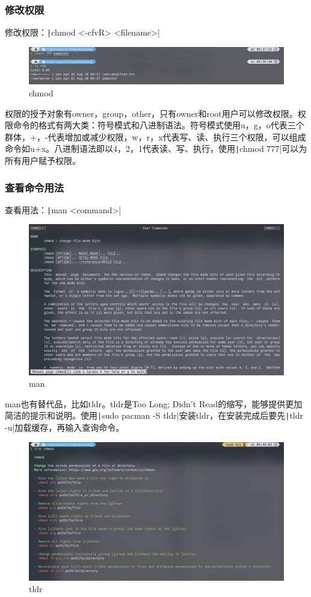 \documentclass[fontset=ubuntu]{ctexart}
\begin{document}
\begin{sloppypar}
\subsubsection{修改权限}
修改权限：\texttt|chmod <-cfvR> <filename>|
\begin{figure}[htb]
    \centering
    \includegraphics[width=0.75\linewidth]{chmod_1.png}
    \caption{chmod}
    \label{fig:chmod_1}
\end{figure}

权限的授予对象有owner，group，other，只有owner和root用户可以修改权限。权限命令的格式有两大类：符号模式和八进制语法。符号模式使用u，g，o代表三个群体，+，-代表增加或减少权限，w，r，x代表写、读、执行三个权限，可以组成命令如u+x。八进制语法即以4，2，1代表读、写、执行，使用\texttt|chmod 777|可以为所有用户赋予权限。

\subsubsection{查看命令用法}
查看用法：\texttt|man <command>|
\begin{figure}[htb]
    \centering
    \includegraphics[width=0.75\linewidth]{man_1.png}
    \caption{man}
    \label{fig:man_1}
\end{figure}

man也有替代品，比如tldr。tldr是Too Long; Didn’t Read的缩写，能够提供更加简洁的提示和说明。使用\texttt|sudo pacman -S tldr|安装tldr，在安装完成后要先\texttt|tldr -u|加载缓存，再输入查询命令。
\begin{figure}[htb]
    \centering
    \includegraphics[width=0.75\linewidth]{tldr_1.png}
    \caption{tldr}
    \label{fig:tldr_1}
\end{figure}


\end{sloppypar}
\end{document}
